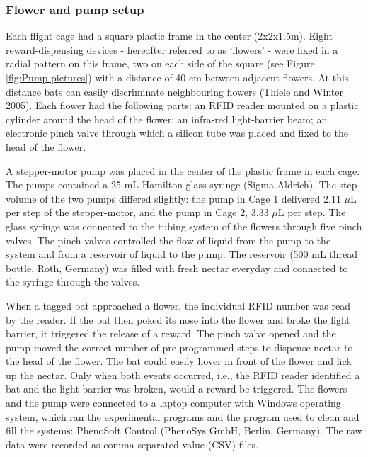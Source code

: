 \documentclass[
]{article}
\begin{document}
\hypertarget{flower-and-pump-setup}{%
\subsubsection{Flower and pump setup}\label{flower-and-pump-setup}}

Each flight cage had a square plastic frame in the center (2x2x1.5m). Eight reward-dispensing devices - hereafter referred to as `flowers' - were fixed in a radial pattern on this frame, two on each side of the square (see Figure \ref{fig:Pump-pictures}) with a distance of 40 cm between adjacent flowers. At this distance bats can easily discriminate neighbouring flowers (Thiele and Winter 2005). Each flower had the following parts: an RFID reader mounted on a plastic cylinder around the head of the flower; an infra-red light-barrier beam; an electronic pinch valve through which a silicon tube was placed and fixed to the head of the flower.

A stepper-motor pump was placed in the center of the plastic frame in each cage. The pumps contained a 25 mL Hamilton glass syringe (Sigma Aldrich). The step volume of the two pumps differed slightly: the pump in Cage 1 delivered 2.11 \(\mu\)L per step of the stepper-motor, and the pump in Cage 2, 3.33 \(\mu\)L per step. The glass syringe was connected to the tubing system of the flowers through five pinch valves. The pinch valves controlled the flow of liquid from the pump to the system and from a reservoir of liquid to the pump. The reservoir (500 mL thread bottle, Roth, Germany) was filled with fresh nectar everyday and connected to the syringe through the valves.

When a tagged bat approached a flower, the individual RFID number was read by the reader. If the bat then poked its nose into the flower and broke the light barrier, it triggered the release of a reward. The pinch valve opened and the pump moved the correct number of pre-programmed steps to dispense nectar to the head of the flower. The bat could easily hover in front of the flower and lick up the nectar. Only when both events occurred, i.e., the RFID reader identified a bat and the light-barrier was broken, would a reward be triggered. The flowers and the pump were connected to a laptop computer with Windows operating system, which ran the experimental programs and the program used to clean and fill the systems: PhenoSoft Control (PhenoSys GmbH, Berlin, Germany). The raw data were recorded as comma-separated value (CSV) files.
\end{document}
